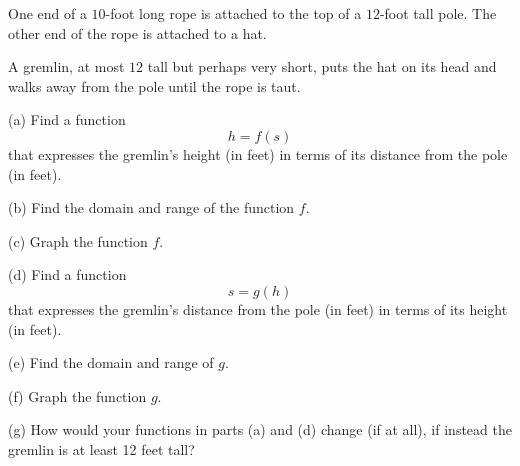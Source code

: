\documentclass{ximera}
\begin{document}
\begin{question}  \label{Qdfsf4tnbnt}
One end of a $10$-foot long rope is attached to the top of a $12$-foot tall pole. The other end of the rope is attached to a hat.

A gremlin, at most $12$ tall but perhaps very short, puts the hat on its head and walks away from the pole until the rope is taut.

(a) Find a function
\[
      h = f(s)
\]
that expresses the gremlin's height (in feet) in terms of its distance from the pole (in feet).

(b) Find the domain and range of the function $f$.

(c) Graph the function $f$. 

(d) Find a function
\[
     s = g(h)
\]
that expresses the gremlin's distance from the pole (in feet)  in terms of its height (in feet).

(e) Find the domain and range of $g$.

(f) Graph the function $g$.

(g) How would your functions in parts (a) and (d) change (if at all), if instead the gremlin is at least 12 feet tall? 

\end{question}
\end{document}
